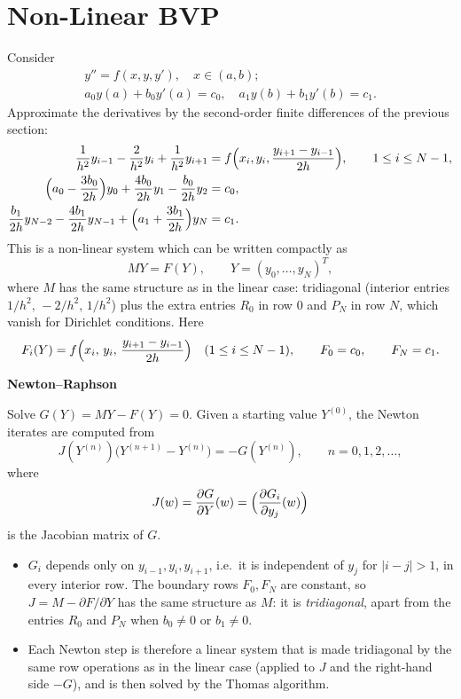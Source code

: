 \documentclass[11pt,a4paper]{article}
\numberwithin{equation}{section}
\theoremstyle{spacedplain}
\theoremstyle{spaceddefinition}
\theoremstyle{spacedremark}
\newcommand{\step}[1]{\par\addvspace{0.6em}\noindent\textbf{#1}\par\nobreak}
\begin{document}
\section{Non-Linear BVP}

Consider
\[
\begin{gathered}
  y''=f(x,y,y'),\quad x\in(a,b);
  \\
  a_0y(a)+b_0y'(a)=c_0,\quad a_1y(b)+b_1y'(b)=c_1.
\end{gathered}
\]
Approximate the derivatives by the second-order finite differences of
the previous section:
\begin{align*}
  \frac1{h^2}y_{i-1}-\frac2{h^2}y_i+\frac1{h^2}y_{i+1}
  &=f\Bigl(x_i,y_i,\frac{y_{i+1}-y_{i-1}}{2h}\Bigr),
    \qquad 1\le i\le N-1,\\
  \Bigl(a_0-\frac{3b_0}{2h}\Bigr)y_0+\frac{4b_0}{2h}y_1
  -\frac{b_0}{2h}y_2&=c_0,\\
  \frac{b_1}{2h}y_{N-2}-\frac{4b_1}{2h}y_{N-1}
  +\Bigl(a_1+\frac{3b_1}{2h}\Bigr)y_N&=c_1.
\end{align*}
This is a non-linear system which can be written compactly as
\[
  MY=F(Y),\qquad Y=(y_0,\dots,y_N)^T,
\]
where \(M\) has the same structure as in the linear case: tridiagonal
(interior entries \(1/h^2,\,-2/h^2,\,1/h^2\)) plus the extra entries
\(R_0\) in row \(0\) and \(P_N\) in row \(N\), which vanish for
Dirichlet conditions.  Here
\[
  F_i(Y)=f\Bigl(x_i,\,y_i,\,\frac{y_{i+1}-y_{i-1}}{2h}\Bigr)
  \quad(1\le i\le N-1),
  \qquad F_0=c_0,\qquad F_N=c_1.
\]

\step{Newton--Raphson}
Solve \(G(Y)=MY-F(Y)=0\).  Given a starting
value \(Y^{(0)}\), the Newton iterates are computed from
\[
  J(Y^{(n)})\bigl(Y^{(n+1)}-Y^{(n)}\bigr)=-G(Y^{(n)}),
  \qquad n=0,1,2,\dots,
\]
where
\[
  J(w)=\frac{\partial G}{\partial Y}(w)
  =\Bigl(\frac{\partial G_i}{\partial y_j}(w)\Bigr)
\]
is the Jacobian matrix of \(G\).
\begin{itemize}
  \item \(G_i\) depends only on \(y_{i-1},y_i,y_{i+1}\), i.e.\ it is
    independent of \(y_j\) for \(|i-j|>1\), in every interior row.  The
    boundary rows \(F_0,F_N\) are constant, so \(J=M-\partial F/\partial Y\)
    has the same structure as \(M\): it is \emph{tridiagonal}, apart from
    the entries \(R_0\) and \(P_N\) when \(b_0\ne0\) or \(b_1\ne0\).
  \item Each Newton step is therefore a linear system that is made
    tridiagonal by the same row operations as in the linear case
    (applied to \(J\) and the right-hand side \(-G\)), and is then solved
    by the Thomas algorithm.
\end{itemize}
\end{document}
